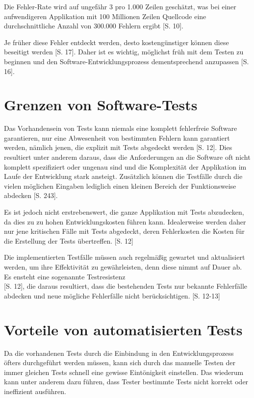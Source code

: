 \documentclass[a4paper,bibtotoc,oneside]{scrbook}
\begin{document}
Die Fehler-Rate wird auf ungefähr 3 pro 1.000 Zeilen geschätzt, was bei einer aufwendigeren Applikation mit 100 Millionen Zeilen Quellcode eine durchschnittliche Anzahl von 300.000 Fehlern ergibt \cite{eval_regression}[S. 10]. 

Je früher diese Fehler entdeckt werden, desto kostengünstiger können diese beseitigt werden \cite{betrieb}[S. 17]. Daher ist es wichtig, möglichst früh mit dem Testen zu beginnen und den Software-Entwicklungsprozess dementsprechend anzupassen \cite{betrieb}[S. 16]. 

\section{Grenzen von Software-Tests}
Das Vorhandensein von Tests kann niemals eine komplett fehlerfreie Software garantieren, nur eine Abwesenheit von bestimmten Fehlern kann garantiert werden, nämlich jenen, die explizit mit Tests abgedeckt werden \cite{eval_regression}[S. 12]. Dies resultiert unter anderem daraus, dass die Anforderungen an die Software oft nicht komplett spezifiziert oder ungenau sind und die Komplexität der Applikation im Laufe der Entwicklung stark ansteigt. Zusätzlich können die Testfälle durch die vielen möglichen Eingaben lediglich einen kleinen Bereich der Funktionsweise abdecken \cite{software_qual}[S. 243].

Es ist jedoch nicht erstrebenswert, die ganze Applikation mit Tests abzudecken, da dies zu zu hohen Entwicklungskosten führen kann. Idealerweise werden daher nur jene kritischen Fälle mit Tests abgedeckt, deren Fehlerkosten die Kosten für die Erstellung der Tests übertreffen. \cite{eval_regression}[S. 12]

Die implementierten Testfälle müssen auch regelmäßig gewartet und aktualisiert werden, um ihre Effektivität zu gewährleisten, denn diese nimmt auf Dauer ab. Es ensteht eine sogenannte \glqq Testresistenz\grqq\\\cite{eval_regression}[S. 12], die daraus resultiert, dass die bestehenden Tests nur bekannte Fehlerfälle abdecken und neue mögliche Fehlerfälle nicht berücksichtigen. \cite{eval_regression}[S. 12-13]

\section{Vorteile von automatisierten Tests}
Da die vorhandenen Tests durch die Einbindung in den Entwicklungsprozess öfters durchgeführt werden müssen, kann sich durch das manuelle Testen der immer gleichen Tests schnell eine gewisse Eintönigkeit einstellen. Das wiederum kann unter anderem dazu führen, dass Tester bestimmte Tests nicht korrekt oder ineffizient ausführen. 
\end{document}
